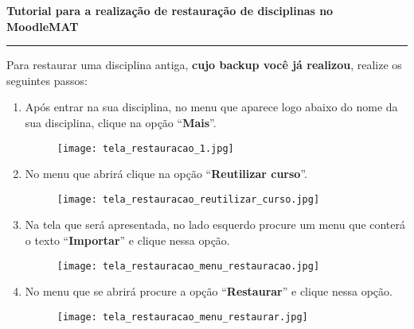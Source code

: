 \documentclass[12pt]{report}
\begin{document}
\newpage
\begin{center}
{\Large \textbf{Tutorial para a realiza\c{c}\~ao de restauração de disciplinas no MoodleMAT}}
\end{center}

\vspace{.3cm}

\hrule

\vspace{.7cm}
Para restaurar uma disciplina antiga, \textbf{cujo backup voc\^e j\'a realizou}, realize os seguintes passos:

\begin{enumerate}[\bf 1)]
	\item Ap\'os entrar na sua disciplina, no menu que aparece logo abaixo do nome da sua disciplina, clique na opção ``\textbf{Mais}''.
	\begin{figure}[H]
    	\centering
    	\hspace*{-2.5cm}\texttt{[image: tela\_restauracao\_1.jpg]}
  	\end{figure}

  	\newpage

	\item No menu que abrirá clique na opção ``\textbf{Reutilizar curso}''.
	\begin{figure}[H]
    	\centering
    	\hspace*{-2.5cm}\texttt{[image: tela\_restauracao\_reutilizar\_curso.jpg]}
  	\end{figure}

  	\newpage

    \item Na tela que será apresentada, no lado esquerdo procure um menu que conterá o texto ``\textbf{Importar}'' e clique nessa opção.
	\begin{figure}[H]
    	\centering
    	\hspace*{-2.5cm}\texttt{[image: tela\_restauracao\_menu\_restauracao.jpg]}
  	\end{figure}

  	\newpage

    \item No menu que se abrirá procure a opção ``\textbf{Restaurar}'' e clique nessa opção.
	\begin{figure}[H]
    	\centering
    	\hspace*{-2.5cm}\texttt{[image: tela\_restauracao\_menu\_restaurar.jpg]}
  	\end{figure}


\end{enumerate}
\end{document}
